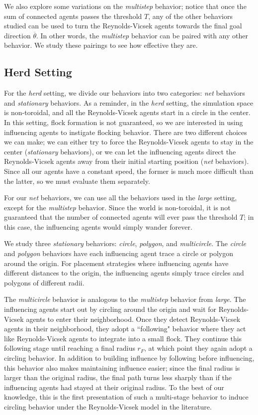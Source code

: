 We also explore some variations on the \textit{multistep} behavior; notice that
once the sum of connected agents passes the threshold $T$, any of the other
behaviors studied can be used to turn the Reynolds-Vicsek agents towards the
final goal direction $\overline{\theta}$.
In other words, the \textit{multistep} behavior can be paired with any other
behavior.
We study these pairings to see how effective they are.

\subsection{Herd Setting}
For the \textit{herd} setting, we divide our behaviors into two categories:
\textit{net} behaviors and \textit{stationary} behaviors.
As a reminder, in the \textit{herd} setting, the simulation space is
non-toroidal, and all the Reynolds-Vicsek agents start in a circle in the
center.
In this setting, flock formation is not guaranteed, so we are interested in
using influencing agents to instigate flocking behavior.
There are two different choices we can make; we can either try to force the
Reynolds-Vicsek agents to stay in the center (\textit{stationary} behaviors),
or we can let the influencing agents direct the Reynolds-Vicsek agents away
from their initial starting position (\textit{net} behaviors).
Since all our agents have a constant speed, the former is much more difficult
than the latter, so we must evaluate them separately.

For our \textit{net} behaviors, we can use all the behaviors used in the
\textit{large} setting, except for the \textit{multistep} behavior.
Since the world is non-toroidal, it is not guaranteed that the number of
connected agents will ever pass the threshold $T$; in this case, the
influencing agents would simply wander forever.

We study three \textit{stationary} behaviors: \textit{circle}, \textit{polygon},
and \textit{multicircle}.
The \textit{circle} and \textit{polygon} behaviors have each influencing agent
trace a circle or polygon around the origin.
For placement strategies where influencing agents have different distances to
the origin, the influencing agents simply trace circles and polygons of
different radii.

The \textit{multicircle} behavior is analogous to the \textit{multistep}
behavior from \textit{large}.
The influencing agents start out by circling around the origin and wait for
Reynolds-Vicsek agents to enter their neighborhood.
Once they detect Reynolds-Vicsek agents in their neighborhood, they adopt a
``following" behavior where they act like Reynolds-Vicsek agents to integrate
into a small flock.
They continue this following stage until reaching a final radius $r_F$, at which
point they again adopt a circling behavior.
In addition to building influence by following before influencing, this behavior
also makes maintaining influence easier; since the final radius is larger than
the original radius, the final path turns less sharply than if the influencing
agents had stayed at their original radius.
To the best of our knowledge, this is the first presentation of such a
multi-stage behavior to induce circling behavior under the Reynolds-Vicsek
model in the literature.

